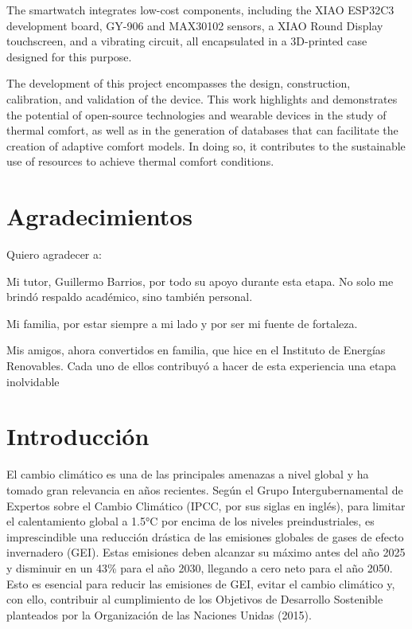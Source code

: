 \documentclass[
  12pt,
  letterpaper,
  DIV=11,
  numbers=noendperiod]{scrreport}
\begin{document}
The smartwatch integrates low-cost components, including the XIAO
ESP32C3 development board, GY-906 and MAX30102 sensors, a XIAO Round
Display touchscreen, and a vibrating circuit, all encapsulated in a
3D-printed case designed for this purpose.

The development of this project encompasses the design, construction,
calibration, and validation of the device. This work highlights and
demonstrates the potential of open-source technologies and wearable
devices in the study of thermal comfort, as well as in the generation of
databases that can facilitate the creation of adaptive comfort models.
In doing so, it contributes to the sustainable use of resources to
achieve thermal comfort conditions.


\hypertarget{agradecimientos}{%
\chapter*{Agradecimientos}\label{agradecimientos}}


Quiero agradecer a:

Mi tutor, Guillermo Barrios, por todo su apoyo durante esta etapa. No
solo me brindó respaldo académico, sino también personal.

Mi familia, por estar siempre a mi lado y por ser mi fuente de
fortaleza.

Mis amigos, ahora convertidos en familia, que hice en el Instituto de
Energías Renovables. Cada uno de ellos contribuyó a hacer de esta
experiencia una etapa inolvidable


\hypertarget{cap-intro}{%
\chapter{Introducción}\label{cap-intro}}

El cambio climático es una de las principales amenazas a nivel global y
ha tomado gran relevancia en años recientes. Según el Grupo
Intergubernamental de Expertos sobre el Cambio Climático (IPCC, por sus
siglas en inglés), para limitar el calentamiento global a 1.5°C por
encima de los niveles preindustriales, es imprescindible una reducción
drástica de las emisiones globales de gases de efecto invernadero (GEI).
Estas emisiones deben alcanzar su máximo antes del año 2025 y disminuir
en un 43\% para el año 2030, llegando a cero neto para el año 2050. Esto
es esencial para reducir las emisiones de GEI, evitar el cambio
climático y, con ello, contribuir al cumplimiento de los Objetivos de
Desarrollo Sostenible planteados por la Organización de las Naciones
Unidas (2015).
\end{document}
